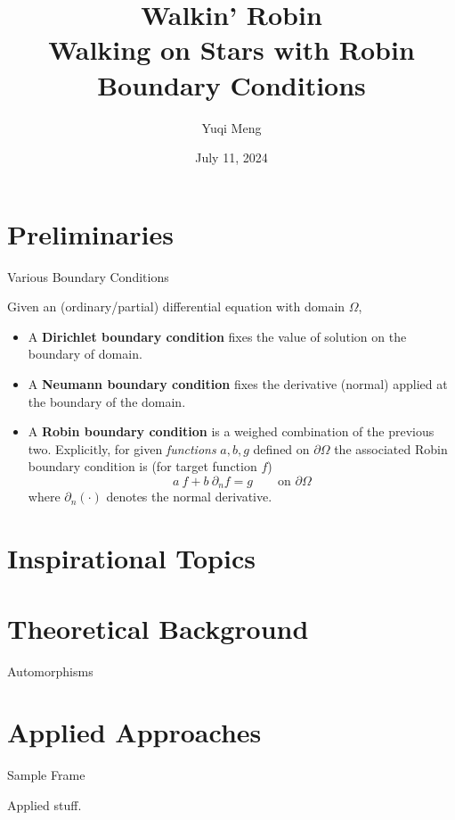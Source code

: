 \documentclass{beamer}
\title{Walkin' Robin \\[1pt] {\Large Walking on Stars with Robin Boundary Conditions}}
\author{Yuqi Meng}
\date{July 11, 2024}
\begin{document}
\maketitle


\section{Preliminaries}

\begin{frame}{Various Boundary Conditions}

	\begin{definition}
		Given an (ordinary/partial) differential equation with domain $\Omega$,
		\begin{itemize}
			\item A \textbf{Dirichlet boundary condition} fixes the value of solution on the boundary of domain. 
			\item A \textbf{Neumann boundary condition} fixes the derivative (normal) applied at the boundary of the domain.
			\item A \textbf{Robin boundary condition} is a weighed combination of the previous two. Explicitly, for given \emph{functions} $a, b, g$ defined on $\partial \Omega$ the associated Robin boundary condition is (for target function $f$)
			\[
				a\ f + b\ \partial_n f = g \qquad \text{on $\partial \Omega$}
			\]
			where $\partial_n(\cdot)$ denotes the normal derivative.
		\end{itemize}
	\end{definition}
	\horzline

\end{frame}


\section{Inspirational Topics}

\begin{frame}
    
\end{frame}


\section{Theoretical Background}

\begin{frame}{Automorphisms}

\end{frame}


\section{Applied Approaches}

\begin{frame}{Sample Frame}

	Applied stuff.

\end{frame}


\thankframe
\end{document}
